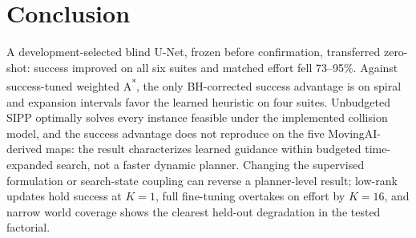 \documentclass[letterpaper]{article} %
\begin{document}
\section{Conclusion}

A development-selected blind U-Net, frozen before confirmation, transferred zero-shot: success improved on all six suites and matched effort fell 73--95\%. Against success-tuned weighted A\textsuperscript{*}, the only BH-corrected success advantage is on spiral and expansion intervals favor the learned heuristic on four suites. Unbudgeted SIPP optimally solves every instance feasible under the implemented collision model, and the success advantage does not reproduce on the five MovingAI-derived maps: the result characterizes learned guidance within budgeted time-expanded search, not a faster dynamic planner. Changing the supervised formulation or search-state coupling can reverse a planner-level result; low-rank updates hold success at $K{=}1$, full fine-tuning overtakes on effort by $K{=}16$, and narrow world coverage shows the clearest held-out degradation in the tested factorial.



\end{document}
